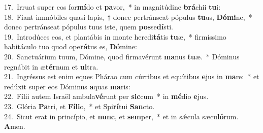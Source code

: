 {17.~}Irruat super eos for\textbf{mí}do et \textbf{pa}vor,~* in magnitúdine \textbf{brá}chii \textbf{tu}i:\\
{18.~}Fiant immóbiles quasi lapis,~† donec pertránseat pópulus \textbf{tu}us, \textbf{Dó}\textbf{mi}ne,~* donec pertránseat pópulus tuus iste, quem \textbf{pos}se\textbf{dí}sti.\\
{19.~}Introdúces eos, et plantábis in monte heredi\textbf{tá}tis \textbf{tu}æ,~* firmíssimo habitáculo tuo quod ope\textbf{rá}tus es, \textbf{Dó}mine:\\
{20.~}Sanctuárium tuum, Dómine, quod firmavérunt \textbf{ma}nus \textbf{tu}æ.~* Dóminus regnábit in æ\textbf{tér}num et \textbf{ul}tra.\\
{21.~}Ingréssus est enim eques Phárao cum cúrribus et equítibus \textbf{e}jus in \textbf{ma}re:~* et redúxit super eos Dóminus \textbf{a}quas \textbf{ma}ris:\\
{22.~}Fílii autem Israël ambula\textbf{vé}runt per \textbf{sic}cum~* in \textbf{mé}dio \textbf{e}jus.\\
{23.~}Glória \textbf{Pa}tri, et \textbf{Fí}\textbf{li}o,~* et Spi\textbf{rí}tui \textbf{San}cto.\\
{24.~}Sicut erat in princípio, et \textbf{nunc}, et \textbf{sem}per,~* et in sǽcula sæcu\textbf{ló}rum. \textbf{A}men.\\
